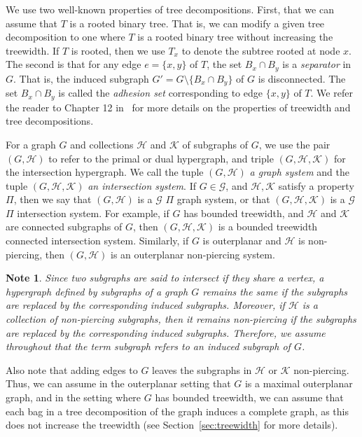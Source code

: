 \documentclass[12pt]{article}
\newcommand{\HH}{\mathcal{H}}
\newcommand{\KK}{\mathcal{K}}
\newtheorem{note}[theorem]{Note}
\theoremstyle{case}
\begin{document}
We use two well-known properties of tree decompositions. First, that we can assume that
$T$ is a rooted binary tree. That is, we can modify a given tree decomposition to one where
$T$ is a rooted binary tree without increasing the treewidth. 
If $T$ is rooted, then we use $T_x$ to denote the subtree rooted at node $x$.
The second is
that for any edge $e=\{x,y\}$ of $T$, the set $B_x\cap B_y$ is a \emph{separator}
in $G$. That is, the induced subgraph $G'=G\setminus\{B_x\cap B_y\}$ of $G$ is disconnected.
The set $B_x\cap B_y$ is called
the \emph{adhesion set} corresponding to edge $\{x,y\}$ of $T$. 
We refer the reader to Chapter 12 in~\cite{diestel2005graph} for more details on the properties of
treewidth and tree decompositions. 

For a graph $G$ and collections $\HH$ and $\KK$ of subgraphs of $G$, we use the pair $(G,\HH)$ to refer to the primal or dual hypergraph, and triple $(G,\HH,\KK)$ for the intersection hypergraph.
We call the tuple $(G,\mathcal{H})$ \emph{a graph system} and the tuple $(G,\mathcal{H},\mathcal{K})$ \emph{an intersection system}.
If $G\in\mathcal{G}$, and $\mathcal{H,K}$ satisfy a property $\Pi$, then we say that
$(G,\mathcal{H})$ is a $\mathcal{G}$ $\Pi$ graph system, or that
$(G,\mathcal{H},\mathcal{K})$ is a $\mathcal{G}$ $\Pi$ intersection system.
For example, 
if $G$ has bounded treewidth, and $\mathcal{H}$ and $\mathcal{K}$ are connected
subgraphs of $G$, then $(G,\mathcal{H},\mathcal{K})$ is a bounded treewidth connected intersection system.
Similarly, if $G$ is outerplanar and $\mathcal{H}$ is non-piercing, then
$(G,\mathcal{H})$ is an outerplanar non-piercing system.

\begin{note}
Since two subgraphs are said to intersect if they share a vertex, a hypergraph defined by subgraphs of a graph $G$ remains the same if the subgraphs are replaced by the corresponding induced subgraphs.
Moreover, if $\HH$ is a collection of non-piercing subgraphs, then it remains non-piercing if the subgraphs are replaced by the corresponding induced subgraphs.
Therefore, we assume throughout that the term \emph{subgraph} refers to an
\emph{induced subgraph} of $G$.
\end{note}


Also note that adding edges to $G$ leaves the subgraphs in $\mathcal{H}$ or $\mathcal{K}$ non-piercing. Thus, we can 
assume in the outerplanar setting that $G$ is a maximal outerplanar graph, and in the setting where $G$ has bounded
treewidth, we can assume that each bag in a tree decomposition of the graph induces a complete graph, as this does 
not increase the treewidth (see Section~\ref{sec:treewidth} for more details).
\end{document}
